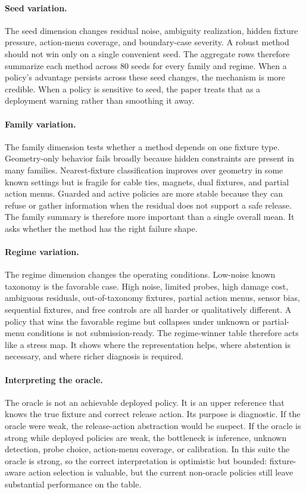 \documentclass{article}
\begin{document}
\paragraph{Seed variation.}
The seed dimension changes residual noise, ambiguity realization, hidden
fixture pressure, action-menu coverage, and boundary-case severity. A robust
method should not win only on a single convenient seed. The aggregate rows
therefore summarize each method across 80 seeds for every family and regime.
When a policy's advantage persists across these seed changes, the mechanism is
more credible. When a policy is sensitive to seed, the paper treats that as a
deployment warning rather than smoothing it away.

\paragraph{Family variation.}
The family dimension tests whether a method depends on one fixture type.
Geometry-only behavior fails broadly because hidden constraints are present in
many families. Nearest-fixture classification improves over geometry in some
known settings but is fragile for cable ties, magnets, dual fixtures, and
partial action menus. Guarded and active policies are more stable because they
can refuse or gather information when the residual does not support a safe
release. The family summary is therefore more important than a single overall
mean. It asks whether the method has the right failure shape.

\paragraph{Regime variation.}
The regime dimension changes the operating conditions. Low-noise known
taxonomy is the favorable case. High noise, limited probes, high damage cost,
ambiguous residuals, out-of-taxonomy fixtures, partial action menus, sensor
bias, sequential fixtures, and free controls are all harder or qualitatively
different. A policy that wins the favorable regime but collapses under unknown
or partial-menu conditions is not submission-ready. The regime-winner table
therefore acts like a stress map. It shows where the representation helps,
where abstention is necessary, and where richer diagnosis is required.

\paragraph{Interpreting the oracle.}
The oracle is not an achievable deployed policy. It is an upper reference that
knows the true fixture and correct release action. Its purpose is diagnostic.
If the oracle were weak, the release-action abstraction would be suspect. If
the oracle is strong while deployed policies are weak, the bottleneck is
inference, unknown detection, probe choice, action-menu coverage, or
calibration. In this suite the oracle is strong, so the correct interpretation
is optimistic but bounded: fixture-aware action selection is valuable, but the
current non-oracle policies still leave substantial performance on the table.
\end{document}
